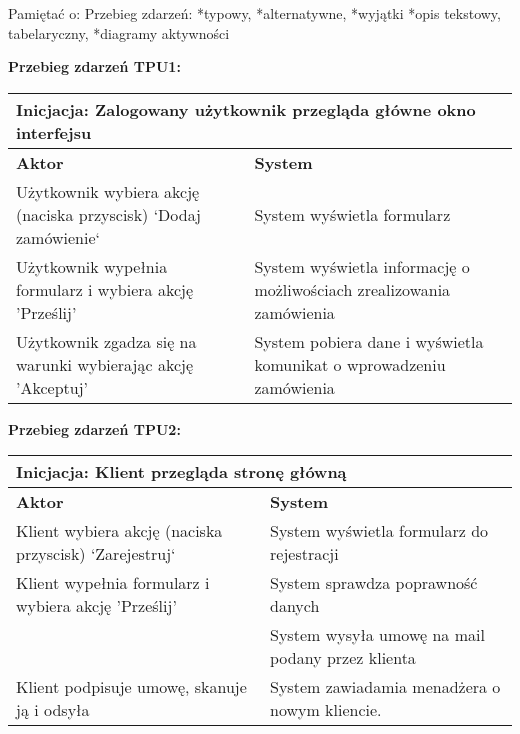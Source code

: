\documentclass[10pt,a4paper,titlepage]{article} %
\begin{document}
		Pamiętać o:\newline
		Przebieg zdarzeń:\newline
		*typowy,\newline
		*alternatywne,\newline
		*wyjątki\newline
		*opis tekstowy, tabelaryczny,\newline
		*diagramy aktywności\newline

		\begin {center}
		{\bf Przebieg zdarzeń TPU1:}\newline
		\begin{tabular}{|p{6cm}|p{6cm}|}
		  \hline
		  \multicolumn{2}{|l|}{Inicjacja: Zalogowany użytkownik przegląda główne okno interfejsu}\\\hline
		  \hline
		  {\bf Aktor} & {\bf System }\\ \hline
		  \hline \hline
		  Użytkownik wybiera akcję (naciska przyscisk) `Dodaj zamówienie` & System wyświetla formularz \\ \hline
		  Użytkownik wypełnia formularz i wybiera akcję 'Prześlij' & System wyświetla informację o możliwościach zrealizowania zamówienia\\ \hline
		  Użytkownik zgadza się na warunki wybierając akcję 'Akceptuj' & System pobiera dane i wyświetla komunikat o wprowadzeniu zamówienia \\
		  \hline
		\end{tabular}
		\end{center}
		
		\begin {center}
		{\bf Przebieg zdarzeń TPU2:}\newline
		\begin{tabular}{|p{6cm}|p{6cm}|}
		  \hline
		  \multicolumn{2}{|l|}{Inicjacja: Klient przegląda stronę główną}\\\hline
		  \hline
		  {\bf Aktor} & {\bf System }\\ \hline
		  \hline \hline
		  Klient wybiera akcję (naciska przyscisk) `Zarejestruj` & System
		  wyświetla formularz do rejestracji \\ \hline Klient wypełnia formularz i
		  wybiera akcję 'Prześlij' & System sprawdza poprawność danych \\ \hline
		  & System wysyła umowę na mail podany przez klienta\\ \hline
		  Klient podpisuje umowę, skanuje ją i odsyła & System zawiadamia menadżera
		  o nowym kliencie.\\
		  \hline
		\end{tabular}
		\end{center}
		
\end{document}
